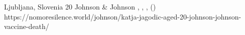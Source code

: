           {Ljubljana, Slovenia}
          {20}
          {Johnson \& Johnson}
          {}
          {
            ,
            ,
            ,
             ()
          }
          {https://nomoresilence.world/johnson/katja-jagodic-aged-20-johnson-johnson-vaccine-death/}


